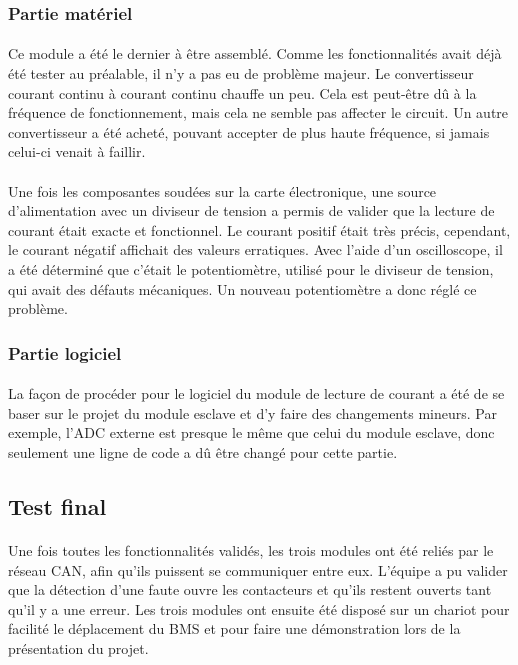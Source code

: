 		\subsubsection{Partie matériel}

			\paragraph{}
			Ce module a été le dernier à être assemblé. Comme les fonctionnalités avait déjà été tester au préalable, il n’y a pas eu de problème majeur. Le convertisseur courant continu à courant continu chauffe un peu. Cela est peut-être dû à la fréquence de fonctionnement, mais cela ne semble pas affecter le circuit. Un autre convertisseur a été acheté, pouvant accepter de plus haute fréquence, si jamais celui-ci venait à faillir.

			\paragraph{}
			Une fois les composantes soudées sur la carte électronique, une source d’alimentation avec un diviseur de tension a permis de valider que la lecture de courant était exacte et fonctionnel. Le courant positif était très précis, cependant, le courant négatif affichait des valeurs erratiques. Avec l'aide d'un oscilloscope, il a été déterminé que c’était le potentiomètre, utilisé pour le diviseur de tension, qui avait des défauts mécaniques. Un nouveau potentiomètre a donc réglé ce problème.

		\subsubsection{Partie logiciel}

			\paragraph{}
			La façon de procéder pour le logiciel du module de lecture de courant a été de se baser sur le projet du module esclave et d'y faire des changements mineurs. Par exemple, l'ADC externe est presque le même que celui du module esclave, donc seulement une ligne de code a dû être changé pour cette partie.




	\subsection{Test final}

		\paragraph{}
		Une fois toutes les fonctionnalités validés, les trois modules ont été reliés par le réseau CAN, afin qu’ils puissent se communiquer entre eux. L’équipe a pu valider que la détection d’une faute ouvre les contacteurs et qu’ils restent ouverts tant qu’il y a une erreur. Les trois modules ont ensuite été disposé sur un chariot pour facilité le déplacement du BMS et pour faire une démonstration lors de la présentation du projet.

